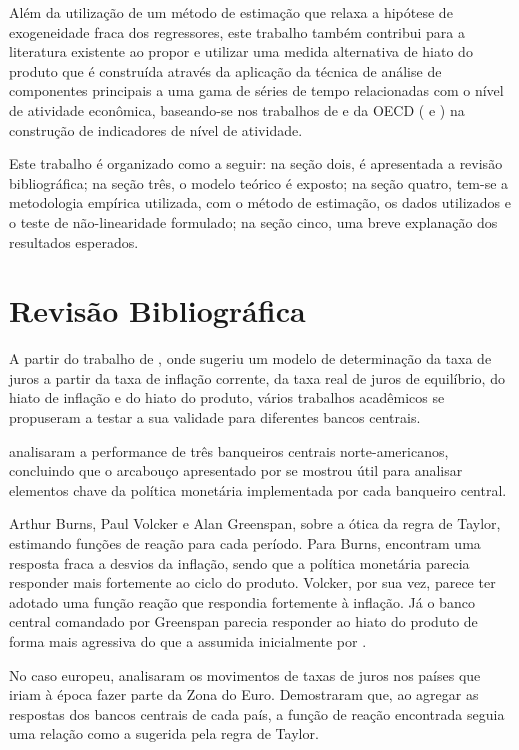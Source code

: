 \documentclass[
	article,			%
	11pt,				%
	oneside,			%
	a4paper,			%
	english,			%
	brazil,				%
	]{abntex2}
\begin{document}
	Além da utilização de um método de estimação que relaxa a hipótese de exogeneidade fraca dos regressores, este trabalho também contribui para a literatura existente ao propor e utilizar uma medida alternativa de hiato do produto que é construída através da aplicação da técnica de análise de componentes principais a uma gama de séries de tempo relacionadas com o nível de atividade econômica, baseando-se nos trabalhos de  e da OECD ( e ) na construção de indicadores de nível de atividade.
	
	Este trabalho é organizado como a seguir: na seção dois, é apresentada a revisão bibliográfica; na seção três, o modelo teórico é exposto; na seção quatro, tem-se a metodologia empírica utilizada, com o método de estimação, os dados utilizados e o teste de não-linearidade formulado; na seção cinco, uma breve explanação dos resultados esperados.
	
	\section{Revisão Bibliográfica}
	
	A partir do trabalho de , onde sugeriu um modelo de determinação da taxa de juros a partir da taxa de inflação corrente, da taxa real de juros de equilíbrio, do hiato de inflação e do hiato do produto, vários trabalhos acadêmicos se propuseram a testar a sua validade para diferentes bancos centrais.
	
	 analisaram a performance de três banqueiros centrais norte-americanos, concluindo que o arcabouço apresentado por  se mostrou útil para analisar elementos chave da política monetária implementada por cada banqueiro central.
	
	Arthur Burns, Paul Volcker e Alan Greenspan, sobre a ótica da regra de Taylor, estimando funções de reação para cada período. Para Burns, encontram uma resposta fraca a desvios da inflação, sendo que a política monetária parecia responder mais fortemente ao ciclo do produto. Volcker, por sua vez, parece ter adotado uma função reação que respondia fortemente à inflação. Já o banco central comandado por Greenspan parecia responder ao hiato do produto de forma mais agressiva do que a assumida inicialmente por . 
	
	No caso europeu,  analisaram os movimentos de taxas de juros nos países que iriam à época fazer parte da Zona do Euro. Demostraram que, ao agregar as respostas dos bancos centrais de cada país, a função de reação encontrada seguia uma relação como a sugerida pela regra de Taylor.
	
\end{document}
